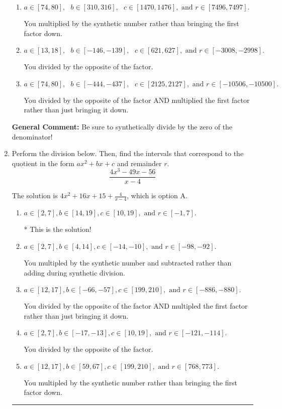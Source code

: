 \documentclass{extbook}[14pt]
\newcommand{\litem}[1]{\item #1

\rule{\textwidth}{0.4pt}}
\begin{document}
\begin{enumerate}
{\begin{enumerate}[label=\Alph*.]
* This is the solution!
\item \( a \in [74, 80], \text{   } b \in [310, 316], \text{   } c \in [1470, 1476], \text{   and   } r \in [7496, 7497]. \)

 You multiplied by the synthetic number rather than bringing the first factor down.
\item \( a \in [13, 18], \text{   } b \in [-146, -139], \text{   } c \in [621, 627], \text{   and   } r \in [-3008, -2998]. \)

 You divided by the opposite of the factor.
\item \( a \in [74, 80], \text{   } b \in [-444, -437], \text{   } c \in [2125, 2127], \text{   and   } r \in [-10506, -10500]. \)

 You divided by the opposite of the factor AND multiplied the first factor rather than just bringing it down.
\end{enumerate}

\textbf{General Comment:} Be sure to synthetically divide by the zero of the denominator!
}
\litem{
Perform the division below. Then, find the intervals that correspond to the quotient in the form $ax^2+bx+c$ and remainder $r$.
\[ \frac{4x^{3} -49 x -56}{x -4} \]

The solution is \( 4x^{2} +16 x + 15 + \frac{4}{x -4} \), which is option A.\begin{enumerate}[label=\Alph*.]
\item \( a \in [2, 7], b \in [14, 19], c \in [10, 19], \text{ and } r \in [-1, 7]. \)

* This is the solution!
\item \( a \in [2, 7], b \in [4, 14], c \in [-14, -10], \text{ and } r \in [-98, -92]. \)

 You multipled by the synthetic number and subtracted rather than adding during synthetic division.
\item \( a \in [12, 17], b \in [-66, -57], c \in [199, 210], \text{ and } r \in [-886, -880]. \)

 You divided by the opposite of the factor AND multipled the first factor rather than just bringing it down.
\item \( a \in [2, 7], b \in [-17, -13], c \in [10, 19], \text{ and } r \in [-121, -114]. \)

 You divided by the opposite of the factor.
\item \( a \in [12, 17], b \in [59, 67], c \in [199, 210], \text{ and } r \in [768, 773]. \)

 You multipled by the synthetic number rather than bringing the first factor down.
\end{enumerate}

}
\end{enumerate}
\end{document}
